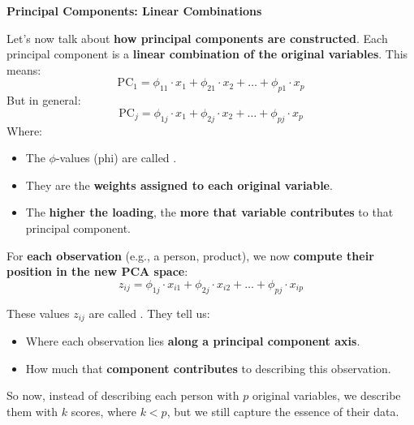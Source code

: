 \highspace
\begin{flushleft}
    \textcolor{Green3}{ \textbf{Principal Components: Linear Combinations}}
\end{flushleft}
Let's now talk about \textbf{how principal components are constructed}. Each principal component is a \textbf{linear combination of the original variables}. This means:
\begin{equation*}
    \text{PC}_{1} = \phi_{11} \cdot x_{1} + \phi_{21} \cdot x_{2} + \dots + \phi_{p1} \cdot x_{p}
\end{equation*}
But in general:
\begin{equation}
    \text{PC}_{j} = \phi_{1j} \cdot x_{1} + \phi_{2j} \cdot x_{2} + \dots + \phi_{pj} \cdot x_{p}
\end{equation}
Where:
\begin{itemize}
    \item The $\phi$-values (phi) are called .
    \item They are the \textbf{weights assigned to each original variable}.
    \item The \textbf{higher the loading}, the \textbf{more that variable contributes} to that principal component.
\end{itemize}
For \textbf{each observation} (e.g., a person, product), we now \textbf{compute their position in the new PCA space}:
\begin{equation}\label{eq: scores}
    z_{ij} = \phi_{1j} \cdot x_{i1} + \phi_{2j} \cdot x_{i2} + \dots + \phi_{pj} \cdot x_{ip}
\end{equation}

\newpage

\noindent
These values $ z_{ij} $ are called . They tell us:
\begin{itemize}
    \item Where each observation lies \textbf{along a principal component axis}.
    \item How much that \textbf{component contributes} to describing this observation.
\end{itemize}
So now, instead of describing each person with $p$ original variables, we describe them with $k$ scores, where $k < p$, but we still capture the essence of their data.
